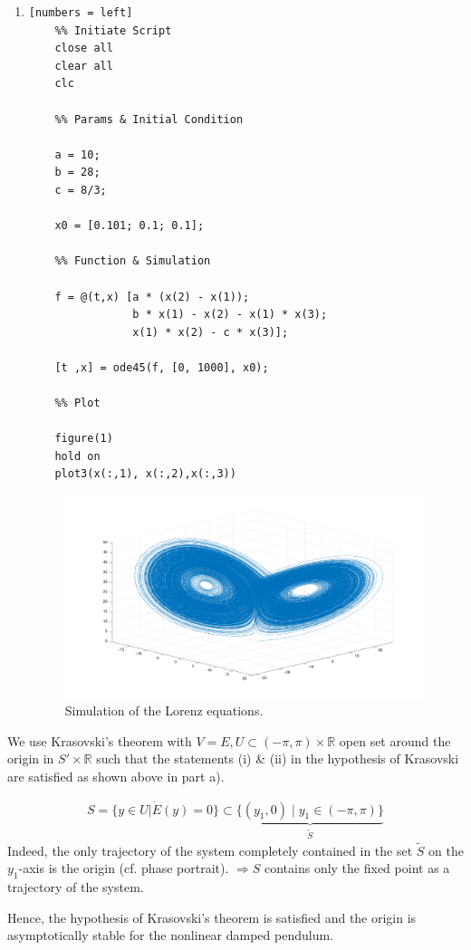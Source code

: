 \begin{solution}[3.5]
\begin{enumerate}
\item
\begin{verbatim}[numbers = left]
	%% Initiate Script
	close all
	clear all
	clc
	
	%% Params & Initial Condition
	
	a = 10;
	b = 28;
	c = 8/3;
	
	x0 = [0.101; 0.1; 0.1];
	
	%% Function & Simulation
	
	f = @(t,x) [a * (x(2) - x(1));
	            b * x(1) - x(2) - x(1) * x(3);
	            x(1) * x(2) - c * x(3)];
	        
	[t ,x] = ode45(f, [0, 1000], x0);
	
	%% Plot
	
	figure(1)
	hold on
	plot3(x(:,1), x(:,2),x(:,3))
\end{verbatim}

\newpage

\begin{figure}[h]
	\centering
	\includegraphics[scale=0.48]{figures/solutions/ch3/S03D01.pdf}
	\caption{Simulation of the Lorenz equations.}
\end{figure}
\end{enumerate}
\end{solution}


\begin{solution}[3.6]
We use Krasovski's theorem with $V = E, U \subset (-\pi, \pi) \times \mathbb{R}$ open set around the origin in $S' \times \mathbb{R}$ such that the statements (i) \& (ii) in the hypothesis of Krasovski are satisfied as shown above in part a).

\begin{align}
	S = \{ y \in U \vert \dot{E}(y)=0 \} \subset \underbrace{\{ (y_1, 0) \;\vert\; y_1 \in (-\pi,\pi) \}}_{\tilde{S}}
\end{align}
Indeed, the only trajectory of the system completely contained in the set $\tilde{S}$ on the $y_1$-axis is the origin (cf. phase portrait). $\Longrightarrow S$ contains only the fixed point as a trajectory of the system.

Hence, the hypothesis of Krasovski's theorem is satisfied and the origin is asymptotically stable for the nonlinear damped pendulum.
\end{solution}

